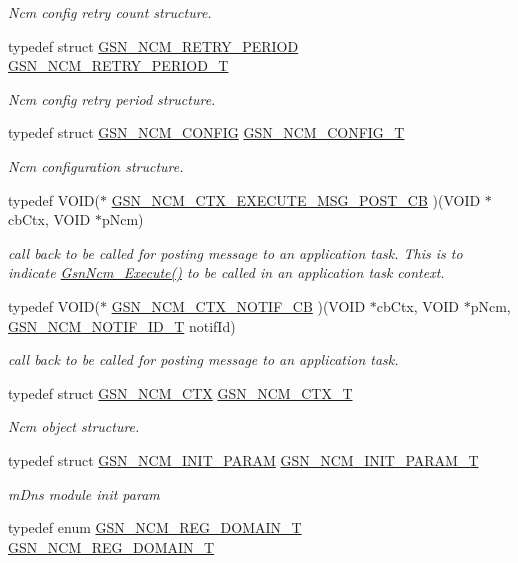 \begin{DoxyCompactItemize}
\begin{DoxyCompactList}\small\item\em Ncm config retry count structure. \end{DoxyCompactList}\item 
typedef struct \hyperlink{a00162}{GSN\_\-NCM\_\-RETRY\_\-PERIOD} \hyperlink{a00688_ga85c994a3952734087a59e5157a99d8c5}{GSN\_\-NCM\_\-RETRY\_\-PERIOD\_\-T}
\begin{DoxyCompactList}\small\item\em Ncm config retry period structure. \end{DoxyCompactList}\item 
typedef struct \hyperlink{a00157}{GSN\_\-NCM\_\-CONFIG} \hyperlink{a00688_ga9095c8feaa607f7d67a5ff8db069ebf2}{GSN\_\-NCM\_\-CONFIG\_\-T}
\begin{DoxyCompactList}\small\item\em Ncm configuration structure. \end{DoxyCompactList}\item 
typedef VOID($\ast$ \hyperlink{a00668_gaf3a0737ada4d7a112e4fff6779bc8162}{GSN\_\-NCM\_\-CTX\_\-EXECUTE\_\-MSG\_\-POST\_\-CB} )(VOID $\ast$cbCtx, VOID $\ast$pNcm)
\begin{DoxyCompactList}\small\item\em call back to be called for posting message to an application task. This is to indicate \hyperlink{a00688_ga3ed4d28d4f2a8195d6c37f5032ee0bbd}{GsnNcm\_\-Execute()} to be called in an application task context. \end{DoxyCompactList}\item 
typedef VOID($\ast$ \hyperlink{a00668_ga9fb71d435556873549a9da8758741a14}{GSN\_\-NCM\_\-CTX\_\-NOTIF\_\-CB} )(VOID $\ast$cbCtx, VOID $\ast$pNcm, \hyperlink{a00688_ga0be96257e7b0db4dd67006357eb5cec6}{GSN\_\-NCM\_\-NOTIF\_\-ID\_\-T} notifId)
\begin{DoxyCompactList}\small\item\em call back to be called for posting message to an application task. \end{DoxyCompactList}\item 
typedef struct \hyperlink{a00158}{GSN\_\-NCM\_\-CTX} \hyperlink{a00688_ga102caaf372e99d011f89da1602cdc514}{GSN\_\-NCM\_\-CTX\_\-T}
\begin{DoxyCompactList}\small\item\em Ncm object structure. \end{DoxyCompactList}\item 
typedef struct \hyperlink{a00159}{GSN\_\-NCM\_\-INIT\_\-PARAM} \hyperlink{a00668_ga82bd88bbe87405a2e10adc0ee4645d7f}{GSN\_\-NCM\_\-INIT\_\-PARAM\_\-T}
\begin{DoxyCompactList}\small\item\em mDns module init param \end{DoxyCompactList}\item 
typedef enum \hyperlink{a00529_a0b425c0b83594b7c2c4fef04ac90fa69}{GSN\_\-NCM\_\-REG\_\-DOMAIN\_\-T} \hyperlink{a00529_a6860aabee0941013271f1956b85eb8b6}{GSN\_\-NCM\_\-REG\_\-DOMAIN\_\-T}
\end{DoxyCompactItemize}
